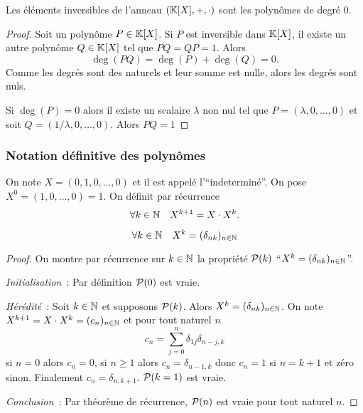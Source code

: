\begin{prop}
  Les éléments inversibles de l'anneau $(\K[X],+,\cdot)$ sont les polynômes de degré $0$.
\end{prop}
\begin{proof}
  Soit un polynôme $P \in \K[X]$. Si $P$ est inversible dans $\K[X]$, il existe un autre polynôme $Q \in \K[X]$ tel que $PQ=QP=1$. Alors
  \begin{equation}
    \deg(PQ)=\deg(P)+\deg(Q)=0.
  \end{equation}
  Comme les degrés sont des naturels et leur somme est nulle, alors les degrés sont nuls.

  Si $\deg(P)=0$ alors il existe un scalaire $\lambda$ non nul tel que $P=(\lambda,0, \ldots, 0)$ et soit $Q=(1/\lambda, 0, \ldots, 0)$. Alors $PQ=1$
\end{proof}

\subsubsection{Notation définitive des polynômes}

On note $X = (0,1,0, \ldots, 0)$ et il est appelé l'``indeterminé''. On pose $X^0=(1,0, \ldots,0)=1$. On définit par récurrence
\begin{equation}
  \forall k \in \N \quad X^{k+1}=X \cdot X^k.
\end{equation}

\begin{lemme}
  \begin{equation}
    \forall k\in \N \quad X^k = (\delta_{nk})_{n \in \N}
  \end{equation}
\end{lemme}
\begin{proof}
  On montre par récurrence sur $k \in \N$ la propriété $\P(k)$ ``$X^k = (\delta_{nk})_{n \in \N}$''.

  \emph{Initialisation}~: Par définition $\P(0)$ est vraie.

  \emph{Hérédité}~: Soit $k \in \N$ et supposons $\P(k)$. Alors $X^k=(\delta_{nk})_{n \in \N}$. On note $X^{k+1}=X \cdot X^k=(c_n)_{n \in \N}$ et pour tout naturel $n$
  \begin{equation}
    c_n = \sum_{j=0}^n \delta_{1j} \delta_{n-j,k}
  \end{equation}
  si $n=0$ alors $c_n=0$, si $n \geqslant 1$ alors $c_n=\delta_{n-1,k}$ donc $c_n=1$ si $n=k+1$ et zéro sinon. Finalement $c_n=\delta_{n,k+1}$. $\P(k=1)$ est vraie.

  \emph{Conclusion}~: Par théorème de récurrence, $\P(n)$ est vraie pour tout naturel $n$.
\end{proof}

